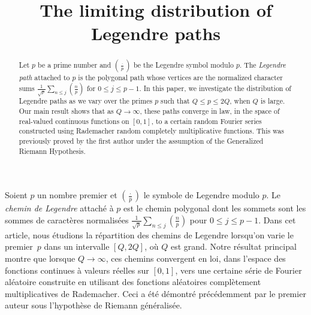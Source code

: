\documentclass[JEP,XML,SOM,Unicode,NoFloatCountersInSection,published]{cedram}
\theoremstyle{plain}
\theoremstyle{definition}
\begin{document}
\frontmatter

\title{The limiting distribution of Legendre paths}

\author[\initial{A.} \lastname{Hussain}]{ }
\address{Department of Mathematics,
University of Exeter\\
North Park Road,
Exeter,
EX4 4QF,
U.K.}

\author[\initial{Y.} \lastname{Lamzouri}]{ }
\address{Université de Lorraine, CNRS, IECL, and Institut Universitaire de France\\
F-54000 Nancy, France}

\begin{abstract}
Let $p$ be a prime number and
$(\frac{\cdot}{p})$ be the Legendre symbol modulo $p$. The \emph{Legendre path} attached to $p$ is the polygonal path whose vertices are the normalized character sums $\frac{1}{\sqrt{p}} \sum_{n\leq j}(\frac{n}{p})$ for $0\leq j\leq p-1$. In this paper, we investigate the distribution of Legendre paths as we vary over the primes $p$ such that $Q\leq p\leq 2Q$, when $Q$ is large. Our main result shows that as $Q \to \infty$, these paths converge in law, in the space of real-valued continuous functions on $[0, 1]$, to a certain random Fourier series constructed using Rademacher random completely multiplicative functions. This was previously proved by the first author under the assumption of the Generalized Riemann Hypothesis.
\end{abstract}





\begin{altabstract}
Soient $p$ un nombre premier et
$(\frac{\cdot}{p})$ le symbole de Legendre modulo $p$. Le \emph{chemin de Legendre} attaché à $p$ est le chemin polygonal dont les sommets sont les sommes de caractères normalisées $\frac{1}{\sqrt{p}} \sum_{n\leq j}(\frac{n}{p})$ pour \hbox{$0\leq j\leq p-1$}. Dans cet article, nous étudions la répartition des chemins de Legendre lorsqu'on varie le premier~$p$ dans un intervalle $[Q, 2Q]$, où $Q$ est grand. Notre résultat principal montre que lorsque \hbox{$Q \to \infty$}, ces chemins convergent en loi, dans l'espace des fonctions continues à valeurs réelles sur $[0, 1]$, vers une certaine série de Fourier aléatoire construite en utilisant des fonctions aléatoires complètement multiplicatives de Rademacher. Ceci a été démontré précédemment par le premier auteur sous l'hypothèse de Riemann généralisée.
\end{altabstract}
\end{document}
